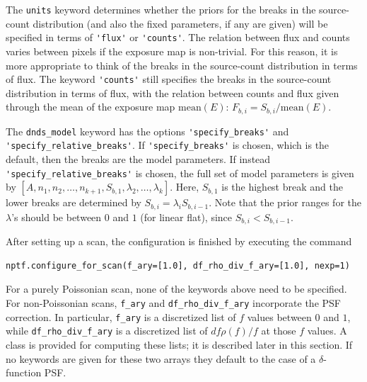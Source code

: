 The \lstinline{units} keyword determines whether the priors for the breaks in the source-count distribution (and also the fixed parameters, if any are given) will be specified in terms of \lstinline{'flux'} or \lstinline{'counts'}.  The relation between flux and counts varies between pixels if the exposure map is non-trivial.  For this reason, it is more appropriate to think of the breaks in the source-count distribution in terms of flux.  The keyword \lstinline{'counts'} still specifies the breaks in the source-count distribution in terms of flux, with the relation between counts and flux given through the mean of the exposure map $\text{mean}(E)$: $F_{b,i} = S_{b,i} / \text{mean}(E)$.  

The \lstinline{dnds_model} keyword has the options \mbox{\lstinline{'specify_breaks'}} and  \lstinline{'specify_relative_breaks'}.  If \lstinline{'specify_breaks'} is chosen, which is the default, then the breaks are the model parameters.  If instead \mbox{\lstinline{'specify_relative_breaks'}} is chosen, the full set of model parameters is given by $[A, n_1, n_2, \ldots, n_{k+1}, S_{b,1}, \lambda_{2}, \ldots, \lambda_{k}]$.  Here, $S_{b,1}$ is the highest break and the lower breaks are determined by $S_{b,i} = \lambda_i S_{b,i-1}$.  Note that the prior ranges for the $\lambda$'s should be between $0$ and $1$ (for linear flat), since $S_{b,i} < S_{b,i-1}$.  

After setting up a scan, the configuration is finished by executing the command 
\begin{lstlisting}
nptf.configure_for_scan(f_ary=[1.0], df_rho_div_f_ary=[1.0], nexp=1)
\end{lstlisting}
For a purely Poissonian scan, none of the keywords above need to be specified.  For non-Poissonian scans, \lstinline{f_ary} and \lstinline{df_rho_div_f_ary} incorporate the PSF correction.  In particular, \lstinline{f_ary} is a discretized list of $f$ values between $0$ and $1$, while  \lstinline{df_rho_div_f_ary} is a discretized list of $df \rho(f) / f$ at those $f$ values.  A class is provided for computing these lists; it is described later in this section.  If no keywords are given for these two arrays they default to the case of a $\delta$-function PSF.  

